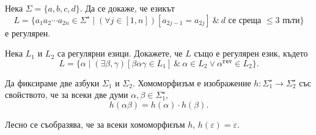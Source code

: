 \begin{problem}
  Нека $\Sigma = \{a,b,c,d\}$.
  Да се докаже, че езикът
  \[L = \{a_1a_2\cdots a_{2n} \in \Sigma^\star \mid (\forall j \in [1,n])[a_{2j-1} = a_{2j}]\ \&\ d\text{ се среща $\leq 3$ пъти}\}\]
  е регулярен.
\end{problem}

\begin{problem}
  Нека $L_1$ и $L_2$ са регулярни езици. Докажете, че $L$ също е регулярен език, където
  \[L = \{\alpha \mid (\exists \beta,\gamma)[\beta\alpha\gamma \in L_1]\ \&\ \alpha \in L_2 \vee \alpha^{\texttt{rev}} \in L_2\}.\]
\end{problem}

\begin{definition}
  Да фиксираме две азбуки $\Sigma_1$ и $\Sigma_2$.
  Хомоморфизъм е изображение $h:\Sigma^\star_1 \to \Sigma^\star_2$ със свойството, че
  за всеки две думи $\alpha,\beta\in\Sigma^\star_1$,
  \[h(\alpha\beta) = h(\alpha)\cdot h(\beta).\]
\end{definition}

Лесно се съобразява, че за всеки хомоморфизъм $h$, $h(\varepsilon) = \varepsilon$.

